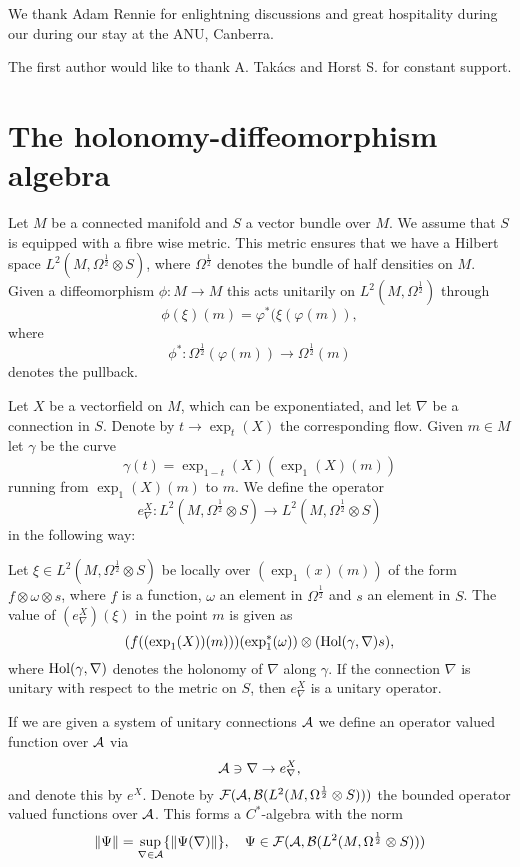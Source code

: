 \documentclass[12pt]{article}
\def\ca{{\cal A}}
\def\cb{{\cal B}}
\def\cf{{\cal F}}
\begin{document}
We thank Adam Rennie for  enlightning discussions and great hospitality during our during our stay at the ANU, Canberra.

The first author would like to thank A. Tak\'acs and Horst S. for constant support.
        



\section{The holonomy-diffeomorphism algebra}
Let $M$ be a connected manifold and $S$ a vector bundle over $M$. We assume that $S$ is equipped with a fibre wise metric. This metric ensures that we have a Hilbert space $L^2 (M , \Omega^{\frac12} \otimes S)$, where $\Omega^{\frac12}$ denotes the bundle of half densities on $M$. Given a diffeomorphism $\phi: M\to M$ this acts unitarily on  $L^2 (M , \Omega^{\frac12} )$ through
$$ \phi (\xi)(m)= \varphi^*(\xi (\varphi (m) )  , $$
where 
$$\phi^* :\Omega^{\frac12} (\varphi (m)) \to \Omega^{\frac12} (m)  $$
denotes the pullback.


Let $X$ be a vectorfield on $M$, which can be exponentiated, and let $\nabla$ be a connection in $S$.  Denote by $t\to \exp_t(X)$ the corresponding flow. Given $m\in M$ let $\gamma$ be the curve  
$$\gamma (t)=\exp_{1-t} (X) (\exp_1 (X)(m) )$$
running from $\exp_1 (X)(m)$ to $m$. We define the operator 
$$e^X_\nabla :L^2 (M , \Omega^{\frac12} \otimes S) \to L^2 (M , \Omega^{\frac12} \otimes S)$$
in the following way:

Let $\xi \in L^2 (M , \Omega^{\frac12} \otimes S)$ be locally over $(\exp_1(x)(m)) $ of the form $f \otimes \omega \otimes s $, where $f$ is a function, $\omega$ an element in $\Omega^{\frac12}$ and $s$ an element in $S$.
The value of $(e^X_\nabla)(\xi)$ in the point  $m$ is given as
$$(f((\exp_1(X))(m)))  (\exp_1^*(\omega)) \otimes (\hbox{Hol}(\gamma , \nabla) s), $$
where $\hbox{Hol}(\gamma , \nabla)$ denotes the holonomy of $\nabla$ along $\gamma$.
If the connection $\nabla$ is unitary with respect to the metric on $S$, then  $e^X_\nabla$ is a unitary operator. 

If we are given a system of unitary connections $\ca$ we define an operator valued function over $\ca$ via
$$\ca \ni \nabla \to e^X_\nabla    ,$$
and denote this by $e^X$. Denote by $\cf (\ca , \cb (L^2(M,\Omega^{\frac12}\otimes S)) )$ the bounded operator valued functions over $\ca$. This forms a $C^*$-algebra with the norm
$$\| \Psi \| =  \sup_{\nabla \in \ca} \{\|  \Psi (\nabla )\| \}, \quad \Psi \in  \cf (\ca , \cb (L^2(M,\Omega^{\frac12}\otimes S)) ) $$ 
  
\end{document}

